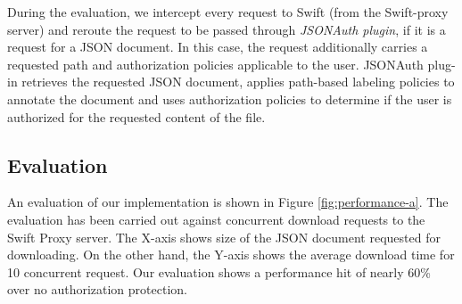  During the evaluation, we intercept every request to Swift (from the Swift-proxy server) and reroute the request to be passed through \textit{JSONAuth plugin}, if it is a request for a JSON document. In this case, the request additionally carries a requested path and authorization policies applicable to the user. JSONAuth plug-in retrieves the requested JSON document, applies path-based labeling policies to annotate the document and uses authorization policies to determine if the user is authorized for the requested content of the file. 

\subsection{Evaluation}



An evaluation of our implementation is shown in Figure \ref{fig:performance-a}. The evaluation has been carried out against concurrent download requests to the Swift Proxy server. The X-axis shows size of the JSON document requested for downloading. On the other hand, the Y-axis shows the average download time for 10 concurrent request. Our evaluation shows a performance hit of nearly 60\% over no authorization protection.


